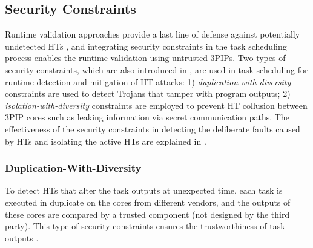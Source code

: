 \documentclass[10pt,journal, compsoc]{IEEEtran}
\begin{document}
\subsection{Security Constraints}

Runtime validation approaches provide a last line of defense against potentially undetected HTs \cite{article:SB}, and integrating security constraints in the task scheduling process enables the runtime validation using untrusted 3PIPs. Two types of security constraints, which are also introduced in \cite{article:SR, conference:AS, article:YS, article:XC, article:CL, article:NW, conference:NW}, are used in task scheduling for runtime detection and mitigation of HT attacks: 1) \textit{duplication-with-diversity} constraints are used to detect Trojans that tamper with program outputs; 2) \textit{isolation-with-diversity} constraints are employed to prevent HT collusion between 3PIP cores such as leaking information via secret communication paths. The effectiveness of the security constraints in detecting the deliberate faults caused by HTs and isolating the active HTs are explained in \cite{article:JR3}. %

\subsubsection{Duplication-With-Diversity}

To detect HTs that alter the task outputs at unexpected time, each task is executed in duplicate on the cores from different vendors, and the outputs of these cores are compared by a trusted component (not designed by the third party). This type of security constraints ensures the trustworthiness of task outputs \cite{conference:DG}.
\end{document}
